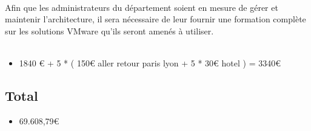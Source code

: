 \paragraph{} Afin que les administrateurs du département soient en mesure de gérer et maintenir l'architecture, il sera nécessaire de leur fournir une formation complète sur les solutions VMware qu'ils seront amenés à utiliser.
\\~
\begin{itemize}
	\item 1840 € + 5 * ( 150€ aller retour paris lyon + 5 * 30€ hotel ) = 3340€
\end{itemize}


\subsection{Total}

\begin{itemize}
	\item 69.608,79€
\end{itemize}